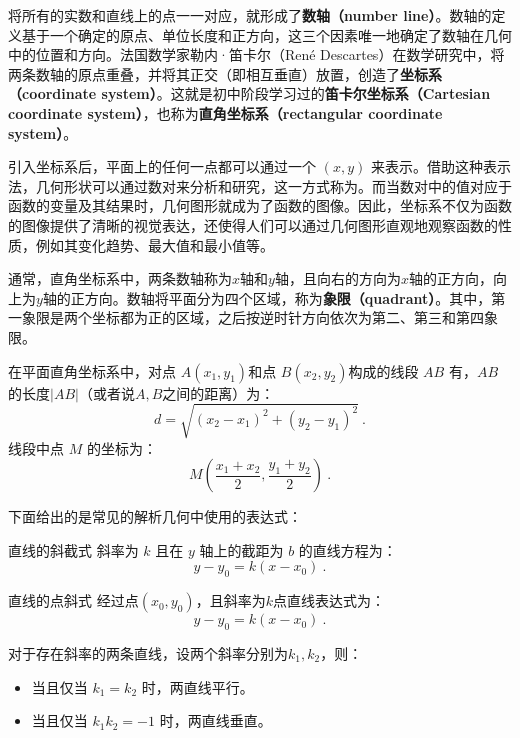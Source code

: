 将所有的实数和直线上的点一一对应，就形成了\textbf{数轴（number line）}。数轴的定义基于一个确定的原点、单位长度和正方向，这三个因素唯一地确定了数轴在几何中的位置和方向。法国数学家勒内·笛卡尔（René Descartes）在数学研究中，将两条数轴的原点重叠，并将其正交（即相互垂直）放置，创造了\textbf{坐标系（coordinate system）}。这就是初中阶段学习过的\textbf{笛卡尔坐标系（Cartesian coordinate system）}，也称为\textbf{直角坐标系（rectangular coordinate system）}。

引入坐标系后，平面上的任何一点都可以通过一个 $(x, y)$ 来表示。借助这种表示法，几何形状可以通过数对来分析和研究，这一方式称为。而当数对中的值对应于函数的变量及其结果时，几何图形就成为了函数的图像。因此，坐标系不仅为函数的图像提供了清晰的视觉表达，还使得人们可以通过几何图形直观地观察函数的性质，例如其变化趋势、最大值和最小值等。

通常，直角坐标系中，两条数轴称为$x$轴和$y$轴，且向右的方向为$x$轴的正方向，向上为$y$轴的正方向。数轴将平面分为四个区域，称为\textbf{象限（quadrant）}。其中，第一象限是两个坐标都为正的区域，之后按逆时针方向依次为第二、第三和第四象限。

在平面直角坐标系中，对点 $A(x_1, y_1)$和点  $B(x_2, y_2) $构成的线段  $AB$  有，$AB$的长度$|AB|$（或者说$A,B$之间的距离）为：
\begin{equation}
d = \sqrt{(x_2 - x_1)^2 + (y_2 - y_1)^2}~.
\end{equation}
线段中点  $M$  的坐标为：
\begin{equation}
M \left( \frac{x_1 + x_2}{2}, \frac{y_1 + y_2}{2} \right)~.
\end{equation}

下面给出的是常见的解析几何中使用的表达式：

\begin{definition}{直线的斜截式}
斜率为  $k$  且在 $y$ 轴上的截距为  $b$  的直线方程为：
\begin{equation}
y-y_0=k(x-x_0)~.
\end{equation}
\end{definition}

\begin{definition}{直线的点斜式}\label{def_HsGeBa_1}
经过点$(x_0,y_0)$，且斜率为$k$点直线表达式为：
\begin{equation}
y-y_0=k(x-x_0)~.
\end{equation}
\end{definition}

对于存在斜率的两条直线，设两个斜率分别为$k_1,k_2$，则：
\begin{itemize}
\item 当且仅当  $k_1 = k_2 $ 时，两直线平行。
\item 当且仅当  $k_1 k_2 = -1$  时，两直线垂直。
\end{itemize}

